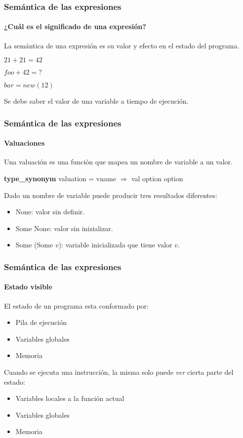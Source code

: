 \begin{frame}
\frametitle{Semántica de las expresiones}
\framesubtitle{¿Cuál es el significado de una expresión?}

La semántica de una expresión es su valor y efecto en el estado del programa.

\pause
\begin{example}
$21 + 21 = 42$

\pause

$foo + 42 = ?$

\pause

$bar = new (12)$
\end{example}
\pause

Se debe saber el valor de una variable a tiempo de ejecución.



\end{frame}


\begin{frame}[fragile]
\frametitle{Semántica de las expresiones}
\framesubtitle{Valuaciones}

Una valuación es una función que mapea un nombre de variable a un valor.

\bigskip
\pause

\textbf{type\_synonym} valuation = vname $\Rightarrow$ val option option

\bigskip

\pause
Dado un nombre de variable puede producir tres resultados diferentes:

\bigskip

\pause
\begin{itemize}
\item{None: valor sin definir.}
\pause
\item{Some None: valor sin inizializar.}
\pause
\item{Some (Some $v$): variable inicializada que tiene valor $v$.}
\end{itemize}


\end{frame}


\begin{frame}
\frametitle{Semántica de las expresiones}
\framesubtitle{Estado visible}

El estado de un programa esta conformado por:
\begin{itemize}
\item Pila de ejecución
\item Variables globales
\item Memoria
\end{itemize}

\pause
Cuando se ejecuta una instrucción, la misma solo puede \textit{ver} cierta parte del estado:

\bigskip
\pause
\begin{itemize}
\item{Variables locales a la función actual}
\pause
\item{Variables globales}
\pause
\item{Memoria}
\end{itemize}


\end{frame}


